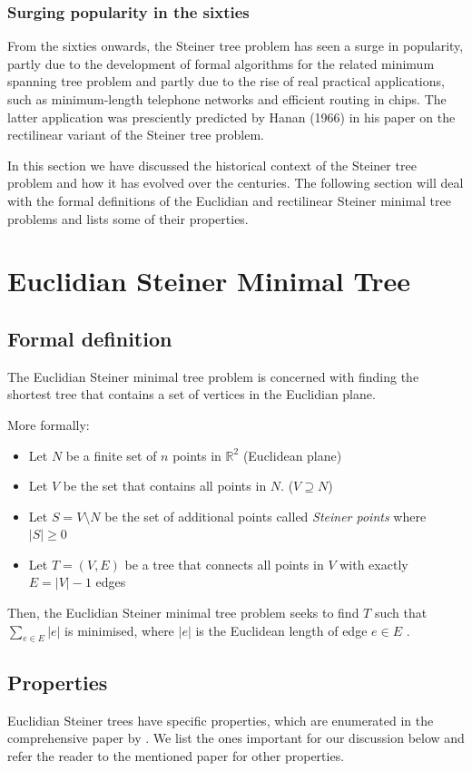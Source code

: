 \documentclass{l4proj}
\begin{document}
\subsubsection{Surging popularity in the sixties}
From the sixties onwards, the Steiner tree problem has seen a surge in popularity, partly due to the development of formal algorithms for the related minimum spanning tree problem and partly due to the rise of real practical applications, such as minimum-length telephone networks and efficient routing in chips. The latter application was presciently predicted by Hanan (1966) in his paper on the rectilinear variant of the Steiner tree problem.

In this section we have discussed the historical context of the Steiner tree problem and how it has evolved over the centuries. The following section will deal with the formal definitions of the Euclidian and rectilinear Steiner minimal tree problems and lists some of their properties.

\section{Euclidian Steiner Minimal Tree}

\subsection{Formal definition}
The Euclidian Steiner minimal tree problem is concerned with finding the shortest tree that contains a set of vertices in the Euclidian plane.

More formally:
\begin{itemize}
    \item Let $N$ be a finite set of $n$ points in $\mathbb{R}^2$ (Euclidean plane)
    \item Let $V$ be the set that contains all points in $N$. ($V \supseteq N$)
    \item Let $S = V \setminus N$ be the set of additional points called \textit{Steiner points} where $|S| \geq 0$
    \item Let $T = (V, E)$ be a tree that connects all points in $V$ with exactly $E = |V| - 1$ edges
\end{itemize}

Then, the Euclidian Steiner minimal tree problem seeks to find $T$ such that $\sum_{e \in E} |e|$ is minimised, where $|e|$ is the Euclidean length of edge $e \in E$ \citep{Brazil2014}.

\subsection{Properties}
\label{sec:esmt_properties}
Euclidian Steiner trees have specific properties, which are enumerated in the comprehensive paper by \cite{Gilbert1968SteinerMT}. We list the ones important for our discussion below and refer the reader to the mentioned paper for other properties.
\end{document}
